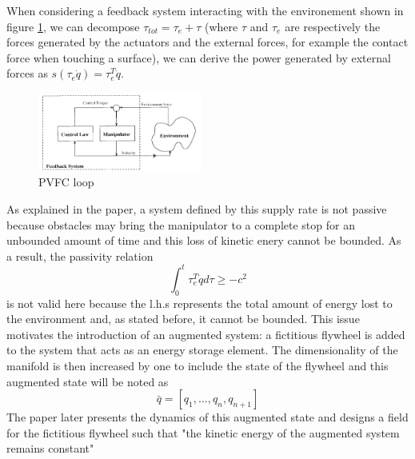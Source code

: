 When considering a feedback system interacting with the environement shown in figure \ref{fig:pvfccontrolloop}, we can decompose $\tau_{tot}=\tau_{e}+\tau$ (where $\tau$ and $\tau_{e}$ are respectively the forces generated by the actuators and the external forces, for example the contact force when touching a surface),
we can derive the power generated by external forces as $s(\tau_{e}\dot{q})=\tau_{e}^T \dot{q}$. 
\begin{figure}[h!]
    \centering
    \includegraphics[width=0.48\textwidth]{Images/pvfccontrolloop.png}
    \caption{PVFC loop \cite{li1999passive}}
    \label{fig:pvfccontrolloop}
\end{figure} 
As explained in the paper, a system defined by this supply rate is not passive because obstacles may bring the manipulator to a complete stop for an unbounded amount of time and this loss of kinetic enery cannot be bounded. 
As a result, the passivity relation 
\begin{equation}
    \int_{0}^{t}\tau_{e}^T \dot{q}d\tau \geq -c^2 
\end{equation}
is not valid here because the l.h.s represents the total amount of energy lost to the environment and, as stated before, it cannot be bounded. 
This issue motivates the introduction of an augmented system: a fictitious flywheel is added to the system that acts as an energy storage element.
The dimensionality of the manifold is then increased by one to include the state of the flywheel and this augmented state will be noted as
\begin{equation} 
    \bar{q}=[q_1,...,q_n,q_{n+1}]
\end{equation}
The paper later presents the dynamics of this augmented state and designs a field for the fictitious flywheel such that "the kinetic energy of the augmented system remains constant"

